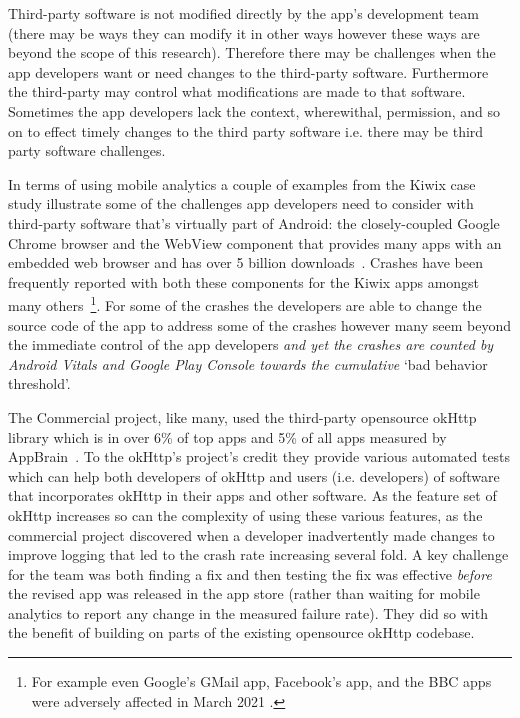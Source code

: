 Third-party software is not modified directly by the app's development team (there may be ways they can modify it in other ways however these ways are beyond the scope of this research). Therefore there may be challenges when the app developers want or need changes to the third-party software. Furthermore the third-party may control what modifications are made to that software. Sometimes the app developers lack the context, wherewithal, permission, and so on to effect timely changes to the third party software i.e. there may be third party software challenges.

In terms of using mobile analytics a couple of examples from the Kiwix case study illustrate some of the challenges app developers need to consider with third-party software that's virtually part of Android: the closely-coupled Google Chrome browser and the WebView component that provides many apps with an embedded web browser and has over 5 billion downloads~\citep{android_webview_app_2022}. Crashes have been frequently reported with both these components for the Kiwix apps amongst many others~\footnote{For example even Google's GMail app, Facebook's app, and the BBC apps were adversely affected in March 2021 \citep{bbcnews2021_google_fixes_crashing_android_app_issues}.}. For some of the crashes the developers are able to change the source code of the app to address some of the crashes however many seem beyond the immediate control of the app developers \emph{and yet the crashes are counted by Android Vitals and Google Play Console towards the cumulative} `bad behavior threshold'. 

The Commercial project, like many, used the third-party opensource okHttp library which is in over 6\% of top apps and 5\% of all apps measured by AppBrain~\citep{appbrain2022_ok_http_stats}.
%
To the okHttp's project's credit they provide various automated tests which can help both developers of okHttp and users (i.e. developers) of software that incorporates okHttp in their apps and other software. As the feature set of okHttp increases so can the complexity of using these various features, as the commercial project discovered when a developer inadvertently made changes to improve logging that led to the crash rate increasing several fold. A key challenge for the team was both finding a fix and then testing the fix was effective \emph{before} the revised app was released in the app store (rather than waiting for mobile analytics to report any change in the measured failure rate). They did so with the benefit of building on parts of the existing opensource okHttp codebase.

